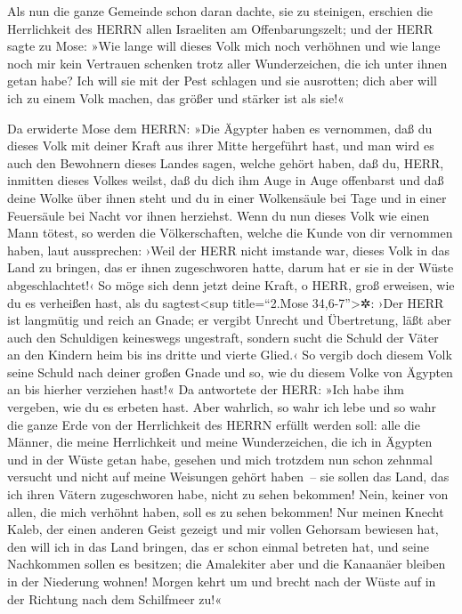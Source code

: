 Als nun die ganze Gemeinde schon daran dachte, sie zu
steinigen, erschien die Herrlichkeit des HERRN allen Israeliten am
Offenbarungszelt; und der HERR sagte zu Mose: »Wie lange
will dieses Volk mich noch verhöhnen und wie lange noch mir kein
Vertrauen schenken trotz aller Wunderzeichen, die ich unter ihnen getan
habe? Ich will sie mit der Pest schlagen und sie
ausrotten; dich aber will ich zu einem Volk machen, das größer und
stärker ist als sie!«

Da erwiderte Mose dem HERRN: »Die Ägypter haben es
vernommen, daß du dieses Volk mit deiner Kraft aus ihrer Mitte
hergeführt hast, und man wird es auch den Bewohnern
dieses Landes sagen, welche gehört haben, daß du, HERR, inmitten dieses
Volkes weilst, daß du dich ihm Auge in Auge offenbarst und daß deine
Wolke über ihnen steht und du in einer Wolkensäule bei Tage und in einer
Feuersäule bei Nacht vor ihnen herziehst. Wenn du nun
dieses Volk wie einen Mann tötest, so werden die Völkerschaften, welche
die Kunde von dir vernommen haben, laut aussprechen:
›Weil der HERR nicht imstande war, dieses Volk in das
Land zu bringen, das er ihnen zugeschworen hatte, darum hat er sie in
der Wüste abgeschlachtet!‹ So möge sich denn jetzt deine
Kraft, o HERR, groß erweisen, wie du es verheißen hast, als du
sagtest\textless sup title=``2.Mose 34,6-7''\textgreater✲:
›Der HERR ist langmütig und reich an Gnade; er vergibt
Unrecht und Übertretung, läßt aber auch den Schuldigen keineswegs
ungestraft, sondern sucht die Schuld der Väter an den Kindern heim bis
ins dritte und vierte Glied.‹ So vergib doch diesem Volk
seine Schuld nach deiner großen Gnade und so, wie du diesem Volke von
Ägypten an bis hierher verziehen hast!« Da antwortete der
HERR: »Ich habe ihm vergeben, wie du es erbeten hast.
Aber wahrlich, so wahr ich lebe und so wahr die ganze
Erde von der Herrlichkeit des HERRN erfüllt werden soll:
alle die Männer, die meine Herrlichkeit und meine
Wunderzeichen, die ich in Ägypten und in der Wüste getan habe, gesehen
und mich trotzdem nun schon zehnmal versucht und nicht auf meine
Weisungen gehört haben~-- sie sollen das Land, das ich
ihren Vätern zugeschworen habe, nicht zu sehen bekommen! Nein, keiner
von allen, die mich verhöhnt haben, soll es zu sehen bekommen!
Nur meinen Knecht Kaleb, der einen anderen Geist gezeigt
und mir vollen Gehorsam bewiesen hat, den will ich in das Land bringen,
das er schon einmal betreten hat, und seine Nachkommen sollen es
besitzen; die Amalekiter aber und die Kanaanäer bleiben
in der Niederung wohnen! Morgen kehrt um und brecht nach der Wüste auf
in der Richtung nach dem Schilfmeer zu!«

